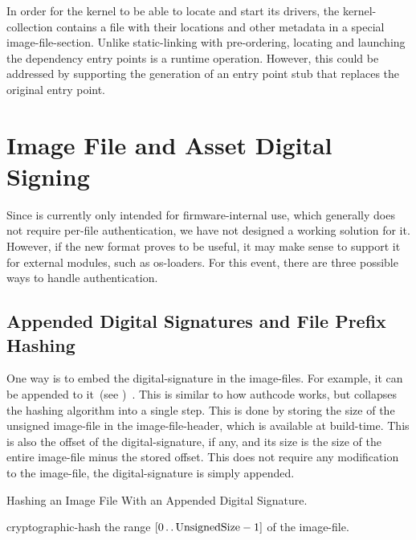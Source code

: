 In order for the kernel to be able to locate and start its drivers, the \gls{kernel-collection} contains a file with their locations and other metadata in a special \gls{image-file-section}. Unlike \gls{static-linking} with pre-ordering, locating and launching the dependency entry points is a runtime operation. However, this could be addressed by supporting the generation of an entry point stub that replaces the original entry point.

\section{Image File and Asset Digital Signing}

Since  is currently only intended for \gls{firmware}-internal use, which generally does not require per-file authentication, we have not designed a working solution for it. However, if the new format proves to be useful, it may make sense to support it for external modules, such as \glspl{os-loader}. For this event, there are three possible ways to handle authentication.

\subsection{Appended Digital Signatures and File Prefix Hashing}

One way is to embed the \gls{digital-signature} in the \glspl{image-file}. For example, it can be appended to it~(see )~\cite{pe-authenticode,linux-kmod-sig}. This is similar to how \gls{authcode} works, but collapses the hashing algorithm into a single step. This is done by storing the size of the unsigned \gls{image-file} in the \gls{image-file-header}, which is available at build-time. This is also the offset of the \gls{digital-signature}, if any, and its size is the size of the entire \gls{image-file} minus the stored offset. This does not require any modification to the \gls{image-file}, the \gls{digital-signature} is simply appended.

\begin{algorithm}
  \caption{Hashing an Image File With an Appended Digital Signature.}
  \label{algo:ehash}
  \begin{algorithmic}[1]
    \State \Gls{cryptographic-hash} the range $[0 \twodots \text{\lstinline{UnsignedSize}} - 1]$ of the \gls{image-file}.
  \end{algorithmic}
\end{algorithm}

